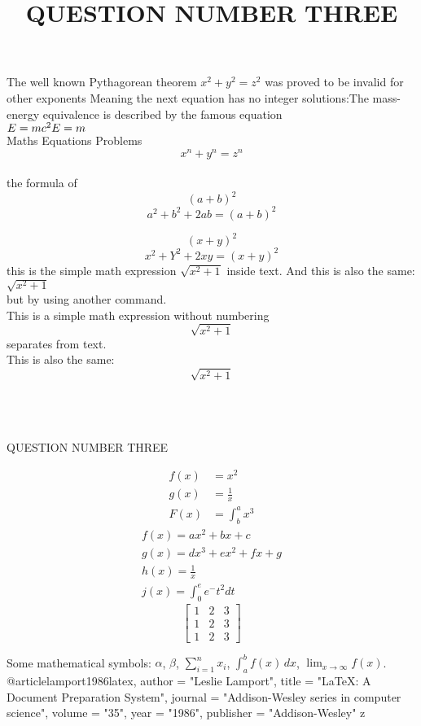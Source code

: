 \documentclass{article}
\begin{document}
	The well known Pythagorean theorem \(x^2 +y^2 = z^2\) was proved to be invalid for other exponents
	Meaning the next equation has no integer solutions:The mass-energy equivalence is described by the famous equation\\
	\begin{math}
		E = mc^2\\
		E = m
	\end{math}\\
		
		Maths Equations Problems\\
		\[x^n + y ^n = z^n\]\\
		the formula of \\
		
		 \[(a+b)^2\]
		 	\begin{equation}
		 		a^2 + b^2 + 2ab = (a+b)^2 
		 \end{equation}

		 
		 \[(x+y)^2\]
		 \begin{equation}
		 	x^2 + Y^2 + 2xy = (x+y)^2
		 \end{equation}
	this is the simple math expression \(\sqrt{x^2+1}\)	inside text.
	And this is also the same:\\	\(\sqrt{x^2+1}\)\\
	but by using another command.\\
	This is a simple math expression without numbering	\[\sqrt{x^2+1}\]
	separates from text.\\
	This is also the same:\[\sqrt{x^2+1}\]\\\\\
	
	\title{QUESTION NUMBER THREE}
	QUESTION NUMBER THREE
	
\begin{align*}
	f(x) &= x^2\\
	g(x) &= \frac{1}{x}\\
	F(x) &= \int^a_b x^3
\end{align*}
\begin{gather}
	f(x) = ax^2 + bx +c\\
	g(x) = dx^3 + ex^2 + fx + g\\
	h(x) = \frac{1}{x}\\
	j(x) = \int^e_0 e^-t^2 dt
\end{gather}
\[
\begin{bmatrix}
	1 & 2 & 3\\
	1 & 2 & 3\\
	 1 & 2 & 3
\end{bmatrix}\]

	Some mathematical symbols: $\alpha$, $\beta$, $\sum_{i=1}^{n} x_i$,
	$\int_{a}^{b} f(x) \, dx$, $\lim_{x \to \infty} f(x)$.\\	
	
	@article{lamport1986latex,
		author = "Leslie Lamport",
		title = "LaTeX: A Document Preparation System",
		journal = "Addison-Wesley series in computer science",
		volume = "35",
		year
		= "1986",
		publisher = "Addison-Wesley"
	}z
		
\end{document}
